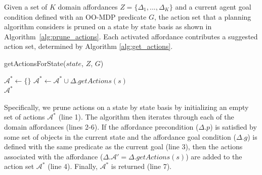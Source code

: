 \documentclass[conference]{IEEEtran}
\begin{document}
Given a set of $K$ domain affordances $Z = \{\Delta_1, ..., \Delta_K\}$ and a current 
agent goal condition defined with an OO-MDP predicate $G$, the action set that a 
planning algorithm considers is pruned on a state by state basis as shown in 
Algorithm~\ref{alg:prune_actions}.  Each 
activated affordance contributes a suggested action set, determined by Algorithm \ref{alg:get_actions}. 

\begin{algorithm}
  \caption{getActionsForState($state$, $Z$, $G$)}
  \begin{algorithmic}[1]
    \State $\mathcal{A}^* \leftarrow \{\}$
    \State $\mathcal{A}^* \leftarrow \mathcal{A}^* \cup \Delta.getActions(s)$
    \EndIf
    \EndFor \\
    \Return $\mathcal{A}^*$
  \end{algorithmic}
  \label{alg:prune_actions}
\end{algorithm}

Specifically, we prune actions on a state by state basis
by initializing an empty set of actions $\mathcal{A}^*$ (line 1). The algorithm then iterates
through each of the domain affordances (lines 2-6). If the affordance
precondition ($\Delta.p$) is satisfied by some set of objects in the current state
and the affordance goal condition ($\Delta.g$) is defined with the same predicate
as the current goal (line 3), then the actions associated with the affordance ($\Delta.\mathcal{A}' = \Delta.getActions(s)$) are added to the action set $\mathcal{A}^*$ (line 4). Finally, $\mathcal{A}^*$ is returned (line 7).
\end{document}
